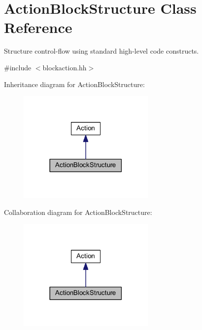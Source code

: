\hypertarget{class_action_block_structure}{}\section{Action\+Block\+Structure Class Reference}
\label{class_action_block_structure}


Structure control-\/flow using standard high-\/level code constructs.  




{\ttfamily \#include $<$blockaction.\+hh$>$}



Inheritance diagram for Action\+Block\+Structure\+:
\nopagebreak
\begin{figure}[H]
\begin{center}
\leavevmode
\includegraphics[width=189pt]{class_action_block_structure__inherit__graph}
\end{center}
\end{figure}


Collaboration diagram for Action\+Block\+Structure\+:
\nopagebreak
\begin{figure}[H]
\begin{center}
\leavevmode
\includegraphics[width=189pt]{class_action_block_structure__coll__graph}
\end{center}
\end{figure}
